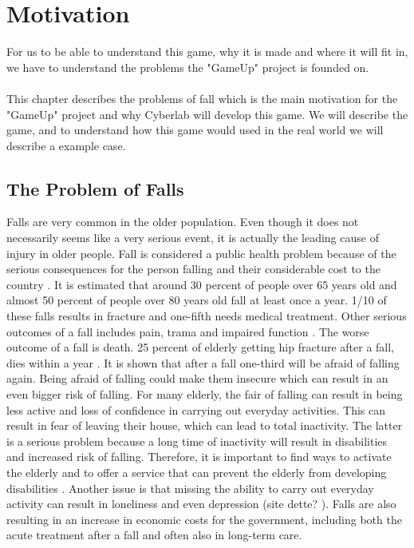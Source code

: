 \chapter{Motivation}
For us to be able to understand this game, why it is made and where it will fit in, we have to understand the problems the "GameUp" project is founded on.  \\ \\
This chapter describes the problems of fall which is the main motivation for the "GameUp" project and why Cyberlab will develop this game. We will describe the game, and to understand how this game would used in the real world we will describe a example case.   

\section{The Problem of Falls}
Falls are very common in the older population. Even though it does not necessarily seems like a very serious event, it is actually the leading cause of injury in older people.  Fall is considered a public health problem because of the serious consequences for the person falling and their considerable cost to the country \cite{otago}.
It is estimated that around 30 percent of people over 65 years old and almost 50 percent of people over 80 years old fall at least once a year. 1/10 of these falls results in fracture and one-fifth needs medical treatment. Other serious outcomes of a fall includes pain, trama and impaired function \cite{otago}.  The worse outcome of a fall is death. 25 percent of elderly getting hip fracture after a fall, dies within a year \cite{gruppetrening-trheim} \cite{larhalsbrudd}. It is shown that after a fall one-third will be afraid of falling again. Being afraid of falling could make them insecure which can result in an even bigger risk of falling. For many elderly, the fair of falling can result in being less active and loss of confidence in carrying out everyday activities. This can result in fear of leaving their house, which can lead to total inactivity. The latter is a serious problem because a long time of inactivity will result in disabilities and increased risk of falling. Therefore, it is important to find ways to activate the elderly and to offer a service that can prevent the elderly from developing disabilities \cite{gruppetrening-trheim}. Another issue is that missing the ability to carry out everyday activity can result in loneliness and even depression (site dette? ). Falls are also resulting in an increase in economic costs for the government, including both the acute treatment after a fall and often also in long-term care. \cite{otago}\\ \\

